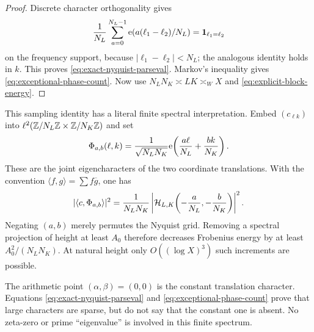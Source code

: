 \begin{proof}
Discrete character orthogonality gives
\[
 \frac1{N_L}\sum_{a=0}^{N_L-1}
 \mathrm e(a(\ell_1-\ell_2)/N_L)=\mathbf 1_{\ell_1=\ell_2}
\]
on the frequency support, because $|\ell_1-\ell_2|<N_L$; the analogous
identity holds in $k$.  This proves \eqref{eq:exact-nyquist-parseval}.
Markov's inequality gives \eqref{eq:exceptional-phase-count}.  Now use
$N_LN_K\asymp LK\asymp_WX$ and
\eqref{eq:explicit-block-energy}.
\end{proof}

This sampling identity has a literal finite spectral interpretation.
Embed $(c_{\ell k})$ into
$\ell^2(\mathbb Z/N_L\mathbb Z\times\mathbb Z/N_K\mathbb Z)$ and set
\begin{equation}
 \Phi_{a,b}(\ell,k)
 =\frac1{\sqrt{N_LN_K}}
 \mathrm e\!\left(\frac{a\ell}{N_L}+\frac{bk}{N_K}\right).
 \label{eq:finite-translation-characters}
\end{equation}
These are the joint eigencharacters of the two coordinate
translations.  With the convention
$\langle f,g\rangle=\sum f\overline g$, one has
\begin{equation}
 |\langle c,\Phi_{a,b}\rangle|^2
 =\frac1{N_LN_K}
 \left|\mathcal H_{L,K}\!\left(-\frac a{N_L},-\frac b{N_K}\right)\right|^2.
 \label{eq:phase-as-spectral-coefficient}
\end{equation}
Negating $(a,b)$ merely permutes the Nyquist grid.
Removing a spectral projection of height at least $A_0$ therefore
decreases Frobenius energy by at least $A_0^2/(N_LN_K)$.  At natural
height only $O((\log X)^3)$ such increments are possible.

\begin{remark}
The arithmetic point $(\alpha,\beta)=(0,0)$ is the constant translation
character.  Equations \eqref{eq:exact-nyquist-parseval} and
\eqref{eq:exceptional-phase-count} prove that large characters are
sparse, but do not say that the constant one is absent.  No zeta-zero
or prime ``eigenvalue'' is involved in this finite spectrum.
\end{remark}
